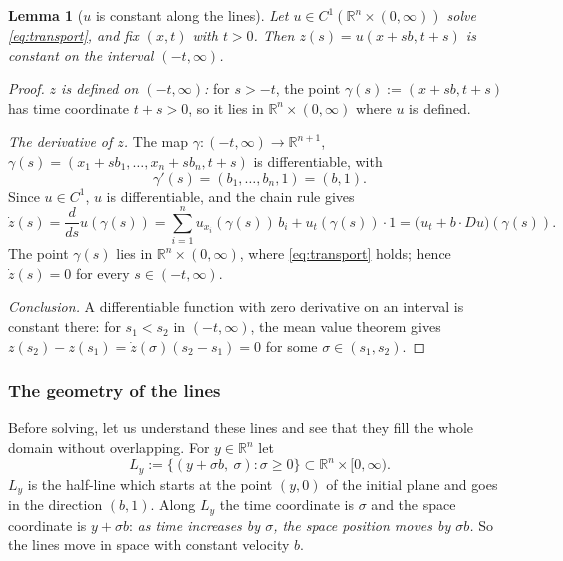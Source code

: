 \documentclass[11pt]{article}
\theoremstyle{plain}
\newtheorem{lemma}[theorem]{Lemma}
\theoremstyle{definition}
\theoremstyle{remark}
\begin{document}
\begin{lemma}[$u$ is constant along the lines]\label{lem:transconst}
Let $u \in C^1(\mathbb{R}^n \times (0,\infty))$ solve \eqref{eq:transport}, and fix $(x,t)$ with $t > 0$. Then $z(s) = u(x + sb, t + s)$ is constant on the interval $(-t,\infty)$.
\end{lemma}
\begin{proof}
\emph{$z$ is defined on $(-t,\infty)$:} for $s > -t$, the point $\gamma(s) := (x + sb, t + s)$ has time coordinate $t + s > 0$, so it lies in $\mathbb{R}^n \times (0,\infty)$ where $u$ is defined.

\emph{The derivative of $z$.} The map $\gamma : (-t,\infty) \to \mathbb{R}^{n+1}$, $\gamma(s) = (x_1 + sb_1, \dots, x_n + sb_n, t + s)$ is differentiable, with
$$ \gamma'(s) = (b_1,\dots,b_n,1) = (b,1). $$
Since $u \in C^1$, $u$ is differentiable, and the chain rule gives
$$ \dot z(s) = \frac{d}{ds}u(\gamma(s)) = \sum_{i=1}^n u_{x_i}(\gamma(s))\,b_i + u_t(\gamma(s))\cdot 1 = \big(u_t + b\cdot Du\big)(\gamma(s)). $$
The point $\gamma(s)$ lies in $\mathbb{R}^n \times (0,\infty)$, where \eqref{eq:transport} holds; hence $\dot z(s) = 0$ for every $s \in (-t,\infty)$.

\emph{Conclusion.} A differentiable function with zero derivative on an interval is constant there: for $s_1 < s_2$ in $(-t,\infty)$, the mean value theorem gives $z(s_2) - z(s_1) = \dot z(\sigma)(s_2 - s_1) = 0$ for some $\sigma \in (s_1,s_2)$.
\end{proof}

\subsubsection{The geometry of the lines}

Before solving, let us understand these lines and see that they fill the whole domain without overlapping. For $y \in \mathbb{R}^n$ let
$$ L_y := \{(y + \sigma b,\ \sigma) : \sigma \geq 0\} \subset \mathbb{R}^n \times [0,\infty). $$
$L_y$ is the half-line which starts at the point $(y,0)$ of the initial plane and goes in the direction $(b,1)$. Along $L_y$ the time coordinate is $\sigma$ and the space coordinate is $y + \sigma b$: \emph{as time increases by $\sigma$, the space position moves by $\sigma b$.} So the lines move in space with constant velocity $b$.
\end{document}
